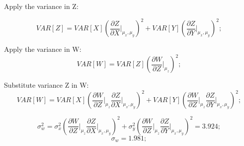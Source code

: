 \documentclass[12pt]{article}
\begin{document}
\begin{description}
\begin{enumerate}[label=\textbf{(\alph*)}]
    Apply the variance in Z:
    
        \begin{equation*}
       VAR[Z]=VAR[X]\left(\frac{\partial Z}{\partial X}\Bigr\rvert_{\mu_x,\mu_y}\right)^2+VAR[Y]\left(\frac{\partial Z}{\partial Y}\Bigr\rvert_{\mu_x,\mu_y}\right)^2;
    \end{equation*}
    
      Apply the variance in W:
      \begin{equation*}
       VAR[W]=VAR[Z]\left(\frac{\partial W}{\partial Z}\Bigr\rvert_{\mu_z}\right)^2;
    \end{equation*}
    
    Substitute variance Z in W:
      \begin{equation*}
       VAR[W]=VAR[X]\left(\frac{\partial W}{\partial Z}\Bigr\rvert_{\mu_z}\frac{\partial Z}{\partial X}\Bigr\rvert_{\mu_x,\mu_y}\right)^2+VAR[Y]\left(\frac{\partial W}{\partial Z}\Bigr\rvert_{\mu_z}\frac{\partial Z}{\partial Y}\Bigr\rvert_{\mu_x,\mu_y}\right)^2;
    \end{equation*}
    
      \begin{equation*}
       \sigma_w^2=\sigma_x^2\left(\frac{\partial W}{\partial Z}\Bigr\rvert_{\mu_z}\frac{\partial Z}{\partial X}\Bigr\rvert_{\mu_x,\mu_y}\right)^2+\sigma_y^2\left(\frac{\partial W}{\partial Z}\Bigr\rvert_{\mu_z}\frac{\partial Z}{\partial Y}\Bigr\rvert_{\mu_x,\mu_y}\right)^2=3.924;
    \end{equation*}
    \begin{equation*}
       \sigma_w=1.981;
    \end{equation*}
    \end{enumerate}
    \fi
    \color{black}
\end{description}
\end{document}
